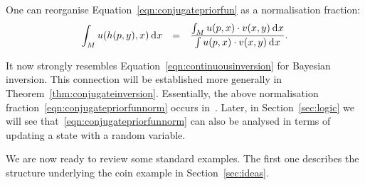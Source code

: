 \documentclass{mscs}
\newcommand{\intd}{{\kern.2em}\mathrm{d}{\kern.03em}}
\begin{document}
One can reorganise Equation~\eqref{eqn:conjugatepriorfun} as
a normalisation fraction:
\begin{equation}
\label{eqn:conjugatepriorfunnorm}
\begin{array}{rcl}
\displaystyle\int_{M} u(h(p,y),x) \intd x
& = &
\displaystyle \frac{\int_{M} u(p,x) \cdot v(x,y) \intd x}
                   {\int u(p,x)\cdot v(x,y)\intd x}.
\end{array}
\end{equation}

\noindent It now strongly resembles
Equation~\eqref{eqn:continuousinversion} for Bayesian inversion. This
connection will be established more generally in
Theorem~\ref{thm:conjugateinversion}. Essentially, the above
normalisation fraction~\eqref{eqn:conjugatepriorfunnorm} occurs
in~\cite[Defn.~5.6]{BernardoS00}. Later, in Section~\ref{sec:logic} we
will see that~\eqref{eqn:conjugatepriorfunnorm} can also be analysed
in terms of updating a state with a random variable.

We are now ready to review some standard examples. The first one
describes the structure underlying the coin example in
Section~\ref{sec:ideas}.
\end{document}
